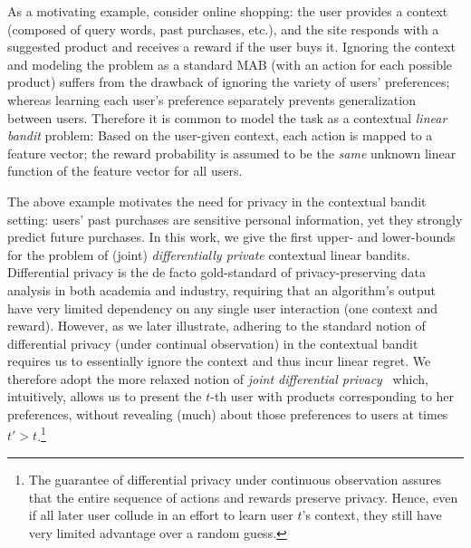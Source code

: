 \documentclass{article}
\begin{document}

As a motivating example, consider online shopping: the user provides a
context (composed of query words, past purchases, etc.), and the site
responds with a suggested product and receives a reward if the user
buys it.  Ignoring the context and modeling the problem as a standard
MAB (with an action for each possible product) suffers from the
drawback of ignoring the variety of users' preferences; whereas
learning each user's preference separately prevents generalization
between users.  Therefore it is common to model the task as a
contextual \emph{linear bandit} problem: Based on the user-given
context, each action is mapped to a feature vector; the
reward probability is assumed to be the \emph{same} unknown linear
function of the feature vector for all users. 

The above example motivates the need for privacy in the contextual
bandit setting: users' past purchases are sensitive personal
information, yet they strongly predict future purchases.
In this work, we give the first upper- and lower-bounds for the
problem of (joint) \emph{differentially private} contextual linear
bandits.  Differential privacy is the de facto gold-standard of
privacy-preserving data analysis in both academia and industry,
requiring that an algorithm's output have very limited dependency on
any single user interaction (one context and reward).  However, as we
later illustrate, adhering to the standard notion of differential
privacy (under continual observation) in the contextual bandit
requires us to essentially ignore the context and thus incur linear
regret.  We therefore adopt the more relaxed notion of \emph{joint
  differential privacy}~\citep{KearnsMechanismDesign2014} which,
intuitively, allows us to present the $t$-th user with products
corresponding to her preferences, without revealing (much) about those
preferences to users at times $t'>t$.\footnote{The guarantee of
  differential privacy under continuous observation assures that the
  entire sequence of actions and rewards preserve privacy.  Hence,
  even if all later user collude in an effort to learn user $t$'s
  context, they still have very limited advantage over a random
  guess.}
\end{document}
